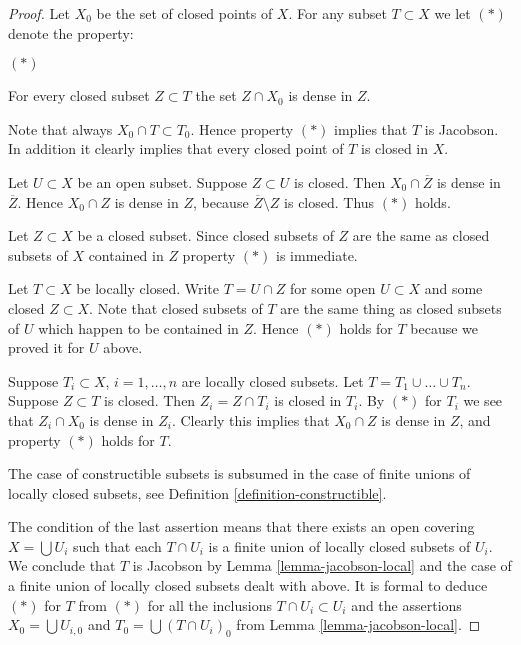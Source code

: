 \begin{proof}
Let $X_0$ be the set of closed points of $X$. For any subset
$T \subset X$ we let $(*)$ denote the property:
\begin{list}{$(*)$}{}
\item For every closed subset $Z \subset T$ the set $Z\cap X_0$
is dense in $Z$.
\end{list}
Note that always $X_0 \cap T \subset T_0$. Hence property $(*)$
implies that $T$ is Jacobson. In addition it clearly implies
that every closed point of $T$ is closed in $X$.

\medskip\noindent
Let $U \subset X$ be an open subset.
Suppose $Z \subset U$ is closed. Then $X_0 \cap \overline{Z}$ is
dense in $\overline{Z}$. Hence $X_0 \cap Z$ is dense in $Z$, because
$\overline{Z} \setminus Z$ is closed. Thus $(*)$ holds.

\medskip\noindent
Let $Z \subset X$ be a closed subset.
Since closed subsets of $Z$ are the same as closed subsets of
$X$ contained in $Z$ property $(*)$ is immediate.

\medskip\noindent
Let $T \subset X$ be locally closed. Write $T = U \cap Z$
for some open $U \subset X$ and some closed $Z \subset X$.
Note that closed subsets of $T$ are the same thing as
closed subsets of $U$ which happen to be contained in $Z$.
Hence $(*)$ holds for $T$ because we proved it for $U$ above.

\medskip\noindent
Suppose $T_i \subset X$, $i = 1, \ldots, n$ are locally closed subsets. Let
$T = T_1 \cup \ldots \cup T_n$. Suppose $Z \subset T$ is closed.
Then $Z_i = Z\cap T_i$ is closed in $T_i$. By $(*)$ for $T_i$ we see that
$Z_i \cap X_0$ is dense in $Z_i$. Clearly this implies that
$X_0 \cap Z$ is dense in $Z$, and property $(*)$ holds for
$T$.

\medskip\noindent
The case of constructible subsets is subsumed in the case
of finite unions of locally closed subsets, see Definition
\ref{definition-constructible}.

\medskip\noindent
The condition of the last assertion means that there exists
an open covering $X = \bigcup U_i$ such that each $T \cap U_i$
is a finite union of locally closed subsets of $U_i$. We conclude
that $T$ is Jacobson by Lemma \ref{lemma-jacobson-local} and the
case of a finite union of locally closed subsets dealt with above.
It is formal to deduce $(*)$ for $T$ from $(*)$ for all the inclusions
$T \cap U_i \subset U_i$ and the assertions $X_0 = \bigcup U_{i, 0}$
and $T_0 = \bigcup (T\cap U_i)_0$ from Lemma \ref{lemma-jacobson-local}.
\end{proof}

